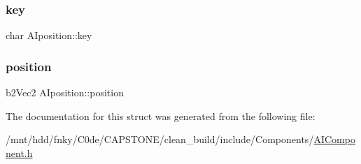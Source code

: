\mbox{\label{structAIposition_a47a0e37eaa5513e5a4faa85473d13ed2}} 
\subsubsection{\texorpdfstring{key}{key}}
{\footnotesize\ttfamily char A\+Iposition\+::key}

\mbox{\label{structAIposition_a6c93076273538f58a68378957f6baf4c}} 
\subsubsection{\texorpdfstring{position}{position}}
{\footnotesize\ttfamily b2\+Vec2 A\+Iposition\+::position}



The documentation for this struct was generated from the following file\+:\begin{DoxyCompactItemize}
\item 
/mnt/hdd/fnky/\+C0de/\+C\+A\+P\+S\+T\+O\+N\+E/clean\+\_\+build/include/\+Components/\hyperlink{AIComponent_8h}{A\+I\+Component.\+h}\end{DoxyCompactItemize}
